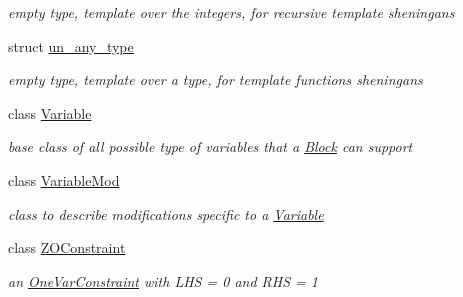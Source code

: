 \begin{DoxyCompactItemize}
\begin{DoxyCompactList}\small\item\em empty type, template over the integers, for recursive template sheningans \end{DoxyCompactList}\item 
struct \mbox{\hyperlink{struct_s_m_spp__di__unipi__it_1_1un__any__type}{un\+\_\+any\+\_\+type}}
\begin{DoxyCompactList}\small\item\em empty type, template over a type, for template functions sheningans \end{DoxyCompactList}\item 
class \mbox{\hyperlink{class_s_m_spp__di__unipi__it_1_1_variable}{Variable}}
\begin{DoxyCompactList}\small\item\em base class of all possible type of variables that a \mbox{\hyperlink{class_s_m_spp__di__unipi__it_1_1_block}{Block}} can support \end{DoxyCompactList}\item 
class \mbox{\hyperlink{class_s_m_spp__di__unipi__it_1_1_variable_mod}{Variable\+Mod}}
\begin{DoxyCompactList}\small\item\em class to describe modifications specific to a \mbox{\hyperlink{class_s_m_spp__di__unipi__it_1_1_variable}{Variable}} \end{DoxyCompactList}\item 
class \mbox{\hyperlink{class_s_m_spp__di__unipi__it_1_1_z_o_constraint}{Z\+O\+Constraint}}
\begin{DoxyCompactList}\small\item\em an \mbox{\hyperlink{class_s_m_spp__di__unipi__it_1_1_one_var_constraint}{One\+Var\+Constraint}} with L\+HS = 0 and R\+HS = 1 \end{DoxyCompactList}\end{DoxyCompactItemize}
